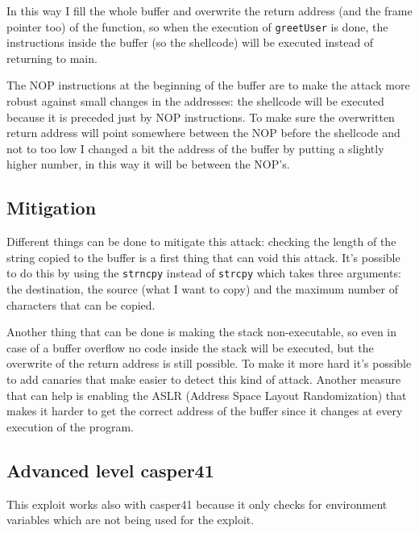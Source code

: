 \documentclass[a4paper,12pt]{article}
\begin{document}

In this way I fill the whole buffer and overwrite the return address (and the frame pointer too) of the function, so when the execution of \texttt{greetUser} is done, the instructions inside the buffer (so the shellcode) will be executed instead of returning to main. 

The NOP instructions at the beginning of the buffer are to make the attack more robust against small changes in the addresses: the shellcode will be executed because it is preceded just by NOP instructions. To make sure the overwritten return address will point somewhere between the NOP before the shellcode and not to too low I changed a bit the address of the buffer by putting a slightly higher number, in this way it will be between the NOP's.


\subsection{Mitigation}

Different things can be done to mitigate this attack: checking the length of the string copied to the buffer is a first thing that can void this attack. It's possible to do this by using the \texttt{strncpy} instead of \texttt{strcpy} which takes three arguments: the destination, the source (what I want to copy) and the maximum number of characters that can be copied.

Another thing that can be done is making the stack non-executable, so even in case of a buffer overflow no code inside the stack will be executed, but the overwrite of the return address is still possible. To make it more hard it's possible to add canaries that make easier to detect this kind of attack. Another measure that can help is enabling the ASLR (Address Space Layout Randomization) that makes it harder to get the correct address of the buffer since it changes at every execution of the program.

\subsection{Advanced level casper41}

This exploit works also with casper41 because it only checks for environment variables which are not being used for the exploit. 
\end{document}
